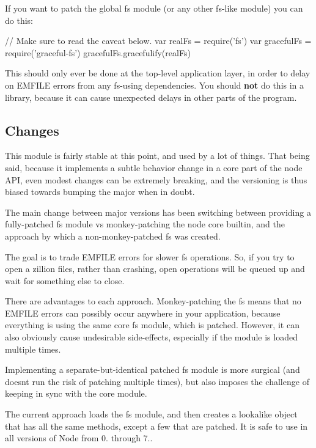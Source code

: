 If you want to patch the global fs module (or any other fs-\/like module) you can do this\+:


\begin{DoxyCode}
// Make sure to read the caveat below.
var realFs = require('fs')
var gracefulFs = require('graceful-fs')
gracefulFs.gracefulify(realFs)
\end{DoxyCode}


This should only ever be done at the top-\/level application layer, in order to delay on E\+M\+F\+I\+LE errors from any fs-\/using dependencies. You should {\bfseries not} do this in a library, because it can cause unexpected delays in other parts of the program.

\subsection*{Changes}

This module is fairly stable at this point, and used by a lot of things. That being said, because it implements a subtle behavior change in a core part of the node A\+PI, even modest changes can be extremely breaking, and the versioning is thus biased towards bumping the major when in doubt.

The main change between major versions has been switching between providing a fully-\/patched {\ttfamily fs} module vs monkey-\/patching the node core builtin, and the approach by which a non-\/monkey-\/patched {\ttfamily fs} was created.

The goal is to trade {\ttfamily E\+M\+F\+I\+LE} errors for slower fs operations. So, if you try to open a zillion files, rather than crashing, {\ttfamily open} operations will be queued up and wait for something else to {\ttfamily close}.

There are advantages to each approach. Monkey-\/patching the fs means that no {\ttfamily E\+M\+F\+I\+LE} errors can possibly occur anywhere in your application, because everything is using the same core {\ttfamily fs} module, which is patched. However, it can also obviously cause undesirable side-\/effects, especially if the module is loaded multiple times.

Implementing a separate-\/but-\/identical patched {\ttfamily fs} module is more surgical (and doesn\textquotesingle{}t run the risk of patching multiple times), but also imposes the challenge of keeping in sync with the core module.

The current approach loads the {\ttfamily fs} module, and then creates a lookalike object that has all the same methods, except a few that are patched. It is safe to use in all versions of Node from 0. through 7..

